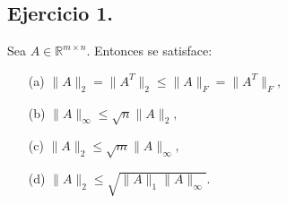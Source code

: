 
\subsection*{Ejercicio 1.}
Sea $A \in \mathbb{R}^{m \times n}$. Entonces se satisface:

\begin{enumerate}
    \item[(a)] $\|A\|_2 = \|A^T\|_2 \leq \|A\|_F = \|A^T\|_F,$
    \item[(b)] $\|A\|_\infty \leq \sqrt{n} \|A\|_2,$
    \item[(c)] $\|A\|_2 \leq \sqrt{m} \|A\|_\infty,$
    \item[(d)] $\|A\|_2 \leq \sqrt{\|A\|_1 \|A\|_\infty}.$
\end{enumerate}